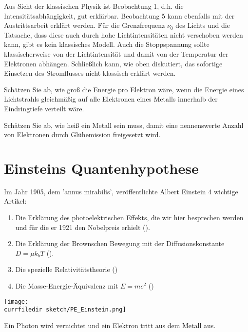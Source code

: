 Aus Sicht der klassischen Physik ist Beobachtung 1, d.h. die Intensitätsabhängigkeit, gut erklärbar. Beobachtung 5 kann ebenfalls mit der Austrittsarbeit erklärt werden. Für die Grenzfrequenz $\nu_0$ des Lichts und die Tatsache, dass diese auch durch hohe Lichtintensitäten nicht verschoben werden kann, gibt es kein klassisches Modell. Auch die Stoppspannung sollte klassischerweise von der Lichtintensität und damit von der Temperatur der Elektronen abhängen. Schließlich kann, wie oben diskutiert, das sofortige Einsetzen des Stromflusses nicht klassisch erklärt werden.

\begin{questions}
    \item Schätzen Sie ab, wie groß die Energie pro Elektron wäre, wenn die Energie eines Lichtstrahls gleichmäßig auf alle Elektronen eines Metalls innerhalb der Eindringtiefe verteilt wäre.
    \item Schätzen Sie ab,  wie heiß ein Metall sein muss, damit eine nennenswerte Anzahl von Elektronen durch Glühemission freigesetzt wird.
\end{questions}

\section{Einsteins Quantenhypothese}

Im Jahr 1905, dem 'annus mirabilis',  veröffentlichte Albert Einstein 4 wichtige Artikel:
\begin{enumerate}\setlength{\itemsep}{0pt}
    \item Die Erklärung des photoelektrischen Effekts, die wir hier besprechen werden und für die er 1921 den Nobelpreis erhielt (\cite{Einstein05_licht}).
    \item Die Erklärung der Brownschen Bewegung mit der Diffusionskonstante $D = \mu k_b T$ (\cite{Einstein05_waerme}).
    \item Die spezielle Relativitätstheorie (\cite{Einstein05_ED})
    \item Die Masse-Energie-Äquivalenz mit $E = m c^2$ (\cite{Einstein05_energie})
\end{enumerate}

\begin{marginfigure}
    \texttt{[image: \\currfiledir sketch/PE\_Einstein.png]}
    \caption{Ein Photon wird vernichtet und ein Elektron tritt aus dem Metall aus.}
\end{marginfigure}


